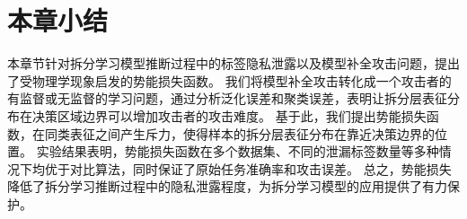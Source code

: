 \section{本章小结}
本章节针对拆分学习模型推断过程中的标签隐私泄露以及模型补全攻击问题，提出了受物理学现象启发的势能损失函数。
%
我们将模型补全攻击转化成一个攻击者的有监督或无监督的学习问题，通过分析泛化误差和聚类误差，表明让拆分层表征分布在决策区域边界可以增加攻击者的攻击难度。
基于此，我们提出势能损失函数，在同类表征之间产生斥力，使得样本的拆分层表征分布在靠近决策边界的位置。
%
实验结果表明，势能损失函数在多个数据集、不同的泄漏标签数量等多种情况下均优于对比算法，同时保证了原始任务准确率和攻击误差。
%
总之，势能损失降低了拆分学习推断过程中的隐私泄露程度，为拆分学习模型的应用提供了有力保护。